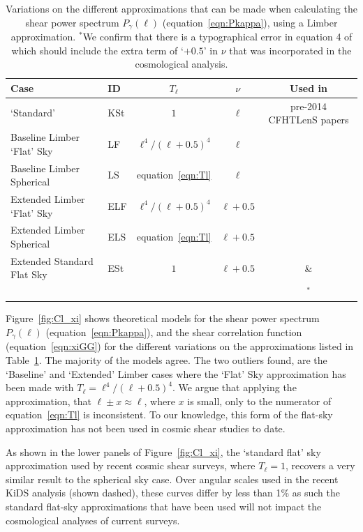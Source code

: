  \begin{table}[htb]
\label{tab:Tl_nu}
\begin{center}
\begin{tabular}{ | l | l | c | c  | c |}
\hline
Case & ID & $T_\ell$ & $\nu$ & Used in \\ \hline
\citet{kitching/etal:2016} `Standard' & KSt & $1$ & $\ell$ & pre-2014 CFHTLenS papers \\
Baseline Limber `Flat' Sky &  LF & $\ell^4 / (\ell + 0.5)^4$ & $\ell$ & \\
Baseline Limber Spherical & LS & equation~\ref{eqn:Tl} & $\ell$ & \\
Extended Limber `Flat' Sky & ELF & $\ell^4 / (\ell + 0.5)^4$ & $\ell + 0.5$ & \\
Extended Limber Spherical & ELS & equation~\ref{eqn:Tl}& $\ell + 0.5$  & \\
Extended Standard Flat Sky & ESt & $1$ & $\ell + 0.5$ & \citet{joudaki/etal:2016} \&  \\
  &  & & & \citet{hildebrandt/etal:2016}$^*$\\\hline
 \end{tabular}
 \end{center}
 \caption{Variations on the different approximations that can be made when calculating the shear power spectrum $P_\gamma(\ell)$ (equation~\ref{eqn:Pkappa}), using a Limber approximation.  $^*$We confirm that there is a typographical error in equation 4 of \citet{hildebrandt/etal:2016} which should include the extra term of `$+0.5$' in $\nu$ that was incorporated in the cosmological analysis.} 
 \end{table}

Figure~\ref{fig:Cl_xi} shows theoretical models for the shear power spectrum $P_\gamma(\ell)$ (equation~\ref{eqn:Pkappa}), and the shear correlation function (equation~\ref{eqn:xiGG}) for the different variations on the approximations listed in Table~\ref{tab:Tl_nu}.   The majority of the models agree.  The two outliers found, are the `Baseline' and `Extended' Limber cases where the \citet{kitching/etal:2016} `Flat' Sky approximation has been made with $T_\ell = \ell^4 / (\ell + 0.5)^4$.    We argue that applying the approximation, that $\ell \pm x \approx \ell$, where $x$ is small, only to the numerator of equation~\ref{eqn:Tl} is inconsistent.    To our knowledge, this form of the flat-sky approximation has not been used in cosmic shear studies to date.

As shown in the lower panels of Figure~\ref{fig:Cl_xi}, the `standard flat' sky approximation used by recent cosmic shear surveys, where $T_\ell = 1$, recovers a very similar result to the spherical sky case.  Over angular scales used in the recent KiDS analysis (shown dashed), these curves differ by less than 1\% as such the standard flat-sky approximations that have been used will not impact the cosmological analyses of current surveys.
 
